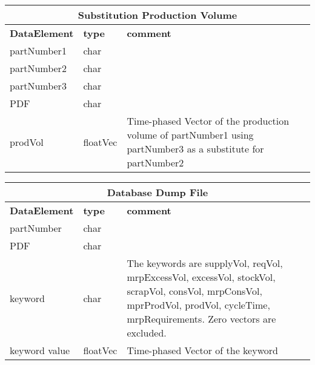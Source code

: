 \vspace{.5in}

\begin{tabular}{llp{4in}}
\multicolumn{3}{c}{{\bf Substitution Production Volume}}\\ \hline\hline
{\bf DataElement} &  {\bf type}  &   {\bf comment} \\ \hline
partNumber1 & char  \\
partNumber2 & char  \\
partNumber3 & char  \\
PDF        & char  \\
prodVol    & floatVec &  Time-phased Vector of the production volume of
                      partNumber1 using partNumber3 as a substitute for
                      partNumber2 \\
\end{tabular}

\vspace{.5in}

\begin{tabular}{llp{4in}}
\multicolumn{3}{c}{{\bf Database Dump File}}\\ \hline\hline
{\bf DataElement} &  {\bf type}  &   {\bf comment} \\ \hline
partNumber & char  \\
PDF & char  \\
keyword & char  & The keywords are supplyVol, reqVol, mrpExcessVol, excessVol,
   stockVol, scrapVol, consVol, mrpConsVol, mprProdVol, prodVol, cycleTime,
   mrpRequirements.
   Zero vectors are excluded.\\
keyword value  & floatVec &  Time-phased Vector of the keyword \\
\end{tabular}


